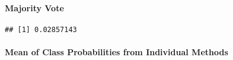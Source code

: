 \documentclass[]{article}
\newenvironment{Shaded}{\begin{snugshade}}{\end{snugshade}}
\newcommand{\DecValTok}[1]{\textcolor[rgb]{0.00,0.00,0.81}{#1}}
\newcommand{\KeywordTok}[1]{\textcolor[rgb]{0.13,0.29,0.53}{\textbf{#1}}}
\newcommand{\NormalTok}[1]{#1}
\newcommand{\OperatorTok}[1]{\textcolor[rgb]{0.81,0.36,0.00}{\textbf{#1}}}
\newcommand{\StringTok}[1]{\textcolor[rgb]{0.31,0.60,0.02}{#1}}
\let\oldparagraph\paragraph
\renewcommand{\paragraph}[1]{\oldparagraph{#1}\mbox{}}
\begin{document}
\hypertarget{majority-vote}{%
\paragraph{Majority Vote}\label{majority-vote}}

\begin{Shaded}
\end{Shaded}

\begin{verbatim}
## [1] 0.02857143
\end{verbatim}

\hypertarget{mean-of-class-probabilities-from-individual-methods}{%
\paragraph{Mean of Class Probabilities from Individual
Methods}\label{mean-of-class-probabilities-from-individual-methods}}
\end{document}

